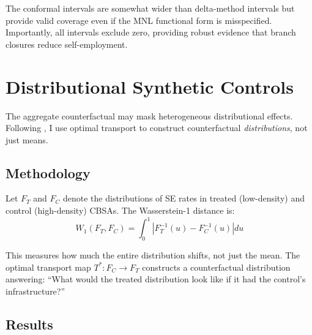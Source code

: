 \documentclass[12pt]{article}
\begin{document}
The conformal intervals are somewhat wider than delta-method intervals but provide valid coverage even if the MNL functional form is misspecified. Importantly, all intervals exclude zero, providing robust evidence that branch closures reduce self-employment.

\section{Distributional Synthetic Controls}
\label{app:distributional}

The aggregate counterfactual may mask heterogeneous distributional effects. Following \citet{gunsilius2023}, I use optimal transport to construct counterfactual \textit{distributions}, not just means.

\subsection{Methodology}

Let $F_T$ and $F_C$ denote the distributions of SE rates in treated (low-density) and control (high-density) CBSAs. The Wasserstein-1 distance is:
\begin{equation}
W_1(F_T, F_C) = \int_0^1 |F_T^{-1}(u) - F_C^{-1}(u)| du
\end{equation}

This measures how much the entire distribution shifts, not just the mean. The optimal transport map $T^*: F_C \rightarrow F_T$ constructs a counterfactual distribution answering: ``What would the treated distribution look like if it had the control's infrastructure?''

\subsection{Results}
\end{document}
